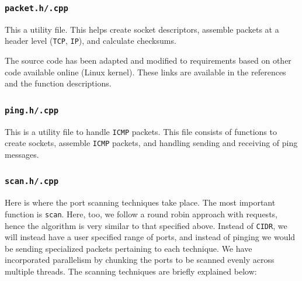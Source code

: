\documentclass[12pt]{article}
\newcommand{\pbreak}{\vspace{4mm}}
\begin{document}
\subsubsection{\texttt{packet.h/.cpp}}
This a utility file. This helps create socket descriptors, assemble packets at a header level (\texttt{TCP}, \texttt{IP}), and calculate checksums.
\pbreak

The source code has been adapted and modified to requirements based on other code available online (Linux kernel). These links are available in the references and the function descriptions.

\subsubsection{\texttt{ping.h/.cpp}}
This is a utility file to handle \texttt{ICMP} packets. This file consists of functions to create sockets, assemble \texttt{ICMP} packets, and handling sending and receiving of ping messages.

\subsubsection{\texttt{scan.h/.cpp}}
Here is where the port scanning techniques take place. The most important function is \texttt{scan}. Here, too, we follow a round robin approach with requests, hence the algorithm is very similar to that specified above. Instead of \texttt{CIDR}, we will instead have a user specified range of ports, and instead of pinging we would be sending specialized packets pertaining to each technique. We have incorporated parallelism by chunking the ports to be scanned evenly across multiple threads. The scanning techniques are briefly explained below:
\end{document}

